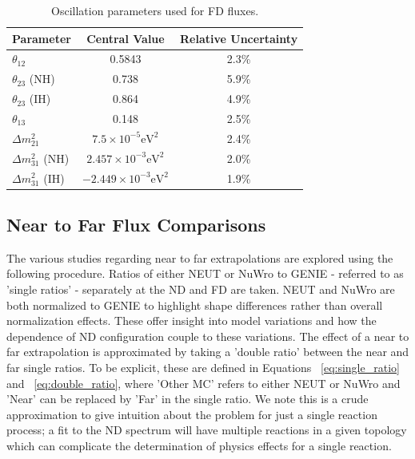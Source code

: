\documentclass[12pt]{article}
\begin{document}
\begin{table}
\centering
 \begin{tabular}{| l  c  c |} 
 \hline 
 Parameter & Central Value & Relative Uncertainty\\ [0.5ex] 
 \hline
 $\theta_{12}$ & 0.5843 & 2.3\% \\ 
 $\theta_{23}$ (NH) & 0.738 & 5.9\% \\
 $\theta_{23}$ (IH) & 0.864 & 4.9\% \\
 $\theta_{13}$ & 0.148 & 2.5\% \\ 
 $\Delta m^2_{21}$ & $7.5\times10^{-5} \textrm{eV}^2$ & 2.4\% \\
 $\Delta m^2_{31}$ (NH) & $2.457\times10^{-3} \textrm{eV}^2$ & 2.0\% \\
 $\Delta m^2_{31}$ (IH) & $-2.449\times10^{-3} \textrm{eV}^2$ & 1.9\% \\[1ex]
 \hline
\end{tabular}
\caption{Oscillation parameters used for FD fluxes.}
\label{tab:osc}
\end{table}


\FloatBarrier
\subsection{Near to Far Flux Comparisons}
\label{subsec:ntf}
The various studies regarding near to far extrapolations are explored using the following procedure. Ratios of either NEUT or NuWro to GENIE - referred to as 'single ratios' - separately at the ND and FD are taken. NEUT and NuWro are both normalized to GENIE to highlight shape differences rather than overall normalization effects. These offer insight into model variations and how the dependence of ND configuration couple to these variations.
The effect of a near to far extrapolation is approximated by taking a 'double ratio' between the near and far single ratios. To be explicit, these are defined in Equations ~\ref{eq:single_ratio} and ~\ref{eq:double_ratio}, where 'Other MC' refers to either NEUT or NuWro and 'Near' can be replaced by 'Far' in the single ratio. We note this is a crude approximation to give intuition about the problem for just a single reaction process; a fit to the ND spectrum will have multiple reactions in a given topology which can complicate the determination of physics effects for a single reaction.
\end{document}
